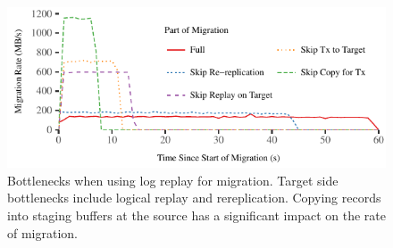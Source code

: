 \begin{figure}[t]
\includegraphics[width=\columnwidth]{graphs/migration-bottlenecks.pdf}
\caption{Bottlenecks when using log replay for migration. Target side
    bottlenecks include logical replay and rereplication.
    Copying records into staging buffers at the source has a
    significant impact on the rate of migration.}
\label{fig:bottlenecks}
\end{figure}
